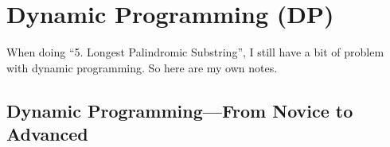 \chapter[Dynamic Programming]
{Dynamic Programming (DP)
  \label{chDynmcPrgrmmng}}

When doing ``5. Longest Palindromic Substring'', I still have a bit of
problem with dynamic programming. So here are my own notes.


\section{Dynamic Programming---From Novice to Advanced
  \label{secDynmicPrgrmmngFrmNvcToAdvncd}}


